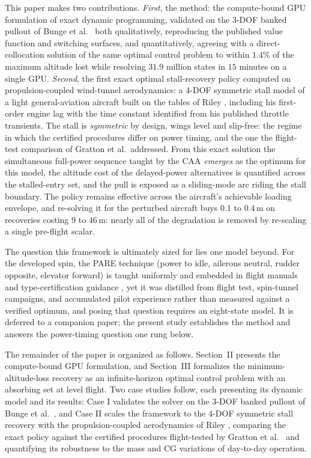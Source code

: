 \documentclass[journal ]{new-aiaa}
\begin{document}
This paper makes two contributions. \emph{First}, the method: the
compute-bound GPU formulation of exact dynamic programming, validated
on the 3-DOF banked pullout of Bunge et al.\ \cite{Bunge2018} both
qualitatively, reproducing the published value function and switching
surfaces, and quantitatively, agreeing with a direct-collocation
solution of the same optimal control problem to within $1.4\%$ of the
maximum altitude lost while resolving $31.9$ million states in $15$
minutes on a single GPU. \emph{Second}, the first exact optimal
stall-recovery policy computed on propulsion-coupled wind-tunnel
aerodynamics: a 4-DOF symmetric stall model of a light
general-aviation aircraft built on the tables of Riley
\cite{Riley1985}, including his first-order engine lag with the time
constant identified from his published throttle transients. The stall
is \emph{symmetric} by design, wings level and slip-free: the regime
in which the certified procedures differ on power timing, and the one
the flight-test comparison of Gratton et al.\ addressed. From this
exact solution the simultaneous full-power sequence taught by the CAA
\emph{emerges} as the optimum for this model, the altitude cost of
the delayed-power alternatives is quantified across the stalled-entry
set, and the pull is exposed as a sliding-mode arc riding the stall
boundary. The policy remains effective across the aircraft's
achievable loading envelope, and re-solving it for the perturbed
aircraft buys $0.1$ to $0.4$\,m on recoveries costing $9$ to
$46$\,m: nearly all of the degradation is removed by re-scaling a
single pre-flight scalar.

The question this framework is ultimately sized for lies one model
beyond. For the developed spin, the PARE technique (power to idle,
ailerons neutral, rudder opposite, elevator forward) is taught
uniformly and embedded in flight manuals and type-certification
guidance \cite{FAA2021, FAA2000}, yet it was distilled from flight
test, spin-tunnel campaigns, and accumulated pilot experience
\cite{Stough1985} rather than measured against a verified optimum,
and posing that question requires an eight-state model. It is
deferred to a companion paper; the present study establishes the
method and answers the power-timing question one rung below.

The remainder of the paper is organized as follows. Section~II
presents the compute-bound GPU formulation, and Section~III formalizes
the minimum-altitude-loss recovery as an infinite-horizon optimal
control problem with an absorbing set at level flight. Two case
studies follow, each presenting its dynamic model and its results:
Case I validates the solver on the 3-DOF banked pullout of Bunge et
al.\ \cite{Bunge2018}, and Case II scales the framework to the 4-DOF
symmetric stall recovery with the propulsion-coupled aerodynamics of
Riley \cite{Riley1985}, comparing the exact policy against the
certified procedures flight-tested by Gratton et al.\
\cite{Gratton2014} and quantifying its robustness to the mass and CG
variations of day-to-day operation.
\end{document}
